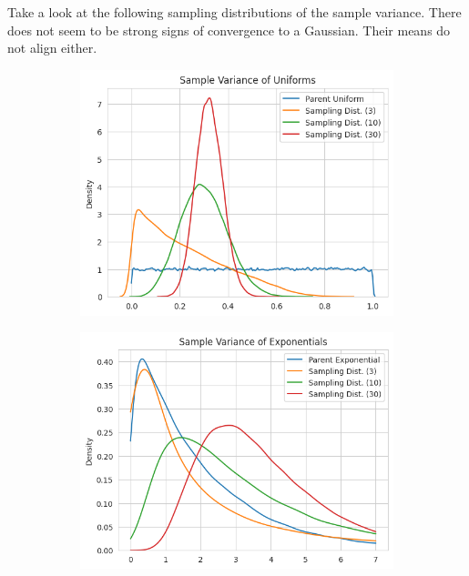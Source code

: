 \documentclass{article}
\begin{document}
    \begin{example}
      Take a look at the following sampling distributions of the sample variance. There does not seem to be strong signs of convergence to a Gaussian. Their means do not align either. 
      \begin{figure}[H]
        \centering
        \begin{subfigure}[b]{0.48\textwidth}
        \centering
          \includegraphics[width=\textwidth]{img/sample_variance_uniform.png}
          \caption{}
          \label{fig:sample_variance_uniform}
        \end{subfigure}
        \hfill 
        \begin{subfigure}[b]{0.48\textwidth}
        \centering
          \includegraphics[width=\textwidth]{img/sample_variance_exp.png}
          \caption{}
          \label{fig:sample_variance_exp}
        \end{subfigure}
        \caption{}
        \label{fig:sample_variance_examples}
      \end{figure}
    \end{example}
\end{document}
